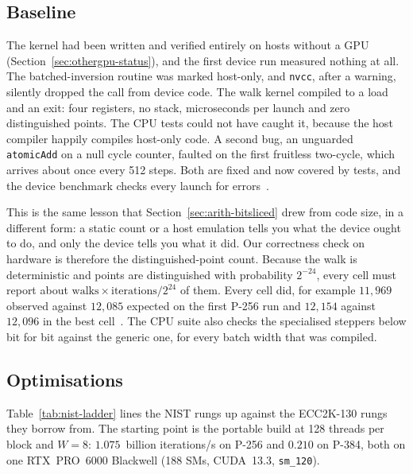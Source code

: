 \subsection{Baseline}
\label{sec:nist-first}

The kernel had been written and verified entirely on hosts without a
GPU (Section~\ref{sec:othergpu-status}), and the first device run
measured nothing at all. The batched-inversion routine was marked
host-only, and \texttt{nvcc}, after a warning, silently dropped the
call from device code. The walk kernel compiled to a load and an exit:
four registers, no stack, microseconds per launch and zero
distinguished points. The CPU tests could not have caught it, because
the host compiler happily compiles host-only code. A second bug, an
unguarded \texttt{atomicAdd} on a null cycle counter, faulted on the
first fruitless two-cycle, which arrives about once every 512 steps.
Both are fixed and now covered by tests, and the device benchmark
checks every launch for errors~.

This is the same lesson that Section~\ref{sec:arith-bitsliced} drew
from code size, in a different form: a static count or a host
emulation tells you what the device ought to do, and only the device
tells you what it did. Our correctness check on hardware is therefore
the distinguished-point count. Because the walk is deterministic and
points are distinguished with probability $2^{-24}$, every cell must
report about $\text{walks}\times\text{iterations}/2^{24}$ of them.
Every cell did, for example $11{,}969$ observed against $12{,}085$
expected on the first P-256 run and $12{,}154$ against $12{,}096$ in
the best cell~.
The CPU suite also checks the specialised steppers below bit for bit
against the generic one, for every batch width that was compiled.

\subsection{Optimisations}
\label{sec:nist-rungs}

Table~\ref{tab:nist-ladder} lines the NIST rungs up against the
ECC2K-130 rungs they borrow from. The starting point is the portable
build at 128 threads per block and $W=8$: $1.075$~billion iterations/s on P-256
and $0.210$ on P-384, both on one RTX~PRO~6000 Blackwell (188 SMs,
CUDA~13.3, \texttt{sm\_120}).

